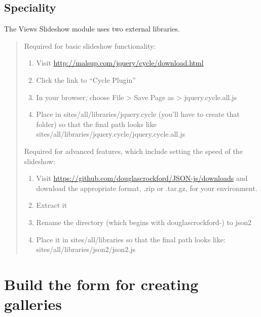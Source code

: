 \documentclass[letterpaper,10pt,english]{sphinxmanual}
\begin{document}
\section{Speciality}
\label{slideshows:speciality}
The Views Slideshow module uses two external libraries.
\begin{quote}

Required for basic slideshow functionality:
\begin{enumerate}
\item {} 
Visit \href{http://malsup.com/jquery/cycle/download.html}{http://malsup.com/jquery/cycle/download.html}

\item {} 
Click the link to “Cycle Plugin”

\item {} 
In your browser, choose File \textgreater{} Save Page as \textgreater{} jquery.cycle.all.js

\item {} 
Place in sites/all/libraries/jquery.cycle (you'll have to create that folder) so that the final path looks like sites/all/libraries/jquery.cycle/jquery.cycle.all.js

\end{enumerate}

Required for advanced features, which include setting the speed of the slideshow:
\begin{enumerate}
\item {} 
Visit \href{https://github.com/douglascrockford/JSON-js/downloads}{https://github.com/douglascrockford/JSON-js/downloads} and download the appropriate format, .zip or .tar.gz, for your environment.

\item {} 
Extract it

\item {} 
Rename the directory (which begins with douglascrockford-) to json2

\item {} 
Place it in sites/all/libraries so that the final path looks like: sites/all/libraries/json2/json2.js

\end{enumerate}
\end{quote}


\chapter{Build the form for creating galleries}
\label{slideshows:build-the-form-for-creating-galleries}
\end{document}

